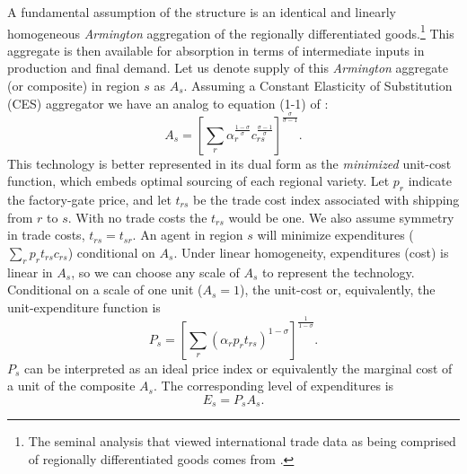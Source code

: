 \documentclass{ejb}
\begin{document}
A fundamental assumption of the \citet{AvW} structure is an identical
and linearly homogeneous \emph{Armington} aggregation of the regionally
differentiated goods.\footnote{The seminal analysis that viewed
	international trade data as being comprised of regionally
	differentiated goods comes from \citet{Armington_1969}.}
This aggregate is then available for absorption in terms of
intermediate inputs in production and final demand.  Let us denote
supply of this \emph{Armington} aggregate (or composite) in region
$s$ as $A_s$.  Assuming a Constant Elasticity of
Substitution (CES) aggregator we have an analog to equation
(1-1) of \citet[p13]{Yotov_etal}:
\begin{equation}
\label{E:primal}
A_s = \left[\sum_r \alpha_r^{\frac{1-\sigma}{\sigma}}
c_{rs}^{\frac{\sigma-1}{\sigma}}\right]^{\frac{\sigma}{\sigma-1}}.
\end{equation}
This technology is better represented in its dual form as the
\emph{minimized} unit-cost function, which embeds optimal sourcing of
each regional variety. Let $p_r$ indicate the factory-gate price, and
let $t_{rs}$ be the trade cost index associated with shipping from $r$
to $s$.  With no trade costs the $t_{rs}$ would be one.  We also
assume symmetry in trade costs, $t_{rs}=t_{sr}$.  An agent in
region $s$ will minimize expenditures ($\sum_r p_r t_{rs} c_{rs}$)
conditional on $A_s$.  Under linear homogeneity, expenditures (cost) is
linear in $A_s$, so we can choose any scale of $A_s$ to represent the
technology.  Conditional on a scale of one unit ($A_s=1$), the unit-cost 
or, equivalently, the unit-expenditure function is  
\begin{equation}
\label{E:P}
P_s = \left[\sum_r \left(\alpha_r p_r
t_{rs}\right)^{1-\sigma}\right]^{\frac{1}{1-\sigma}}.
\end{equation}
$P_s$ can be interpreted as an ideal price index or equivalently the 
marginal cost of a unit of the composite $A_s$.  The corresponding 
level of expenditures is 
\begin{equation}
\label{E:Exp}
E_s = P_s A_s.
\end{equation}
\end{document}
